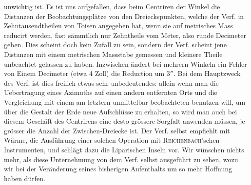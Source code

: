 unwichtig ist. Es ist uns aufgefallen, dass beim Centriren der Winkel die Distanzen der
Beobachtungsplätze von den Dreieckspunkten, welche der Verf. in Zehntausendtheilen von Toisen
angegeben hat, wenn sie auf metrisches Mass reducirt werden, fast sämmtlich nur Zehntheile vom
Meter, also runde Decimeter geben. Dies scheint doch kein Zufall zu sein, sondern der Verf. scheint
jene Distanzen mit einem metrischen Massstabe gemessen und kleinere Theile unbeachtet gelassen zu
haben. Inzwischen ändert bei mehrern Winkeln ein Fehler von Einem Decimeter (etwa 4 Zoll) die
Reduction um $3''$. Bei dem Hauptzweck des Verf. ist dies freilich etwas sehr unbedeutendes: allein
wenn man die Uebertragung eines Azimuths auf einen andern entfernten Orts und die Vergleichung mit
einem am letztern unmittelbar beobachteten benutzen will, um über die Gestalt der Erde neue
Aufschlüsse zu erhalten, so wird man auch bei diesem Geschäft des Centrirens eine desto grössere
Sorgfalt anwenden müssen, je grösser die Anzahl der Zwischen-Dreiecke ist. Der Verf. selbst
empfiehlt mit Wärme, die Ausführung einer solchen Operation mit \textsc{Reichenbach}'schen
Instrumenten, und schlägt dazu die Liparischen Inseln vor. Wir wünschen nichts mehr, als diese
Unternehmung von dem Verf. selbst ausgeführt zu sehen, wozu wir bei der Veränderung seines
bisherigen Aufenthalts um so mehr Hoffnung haben dürfen.

